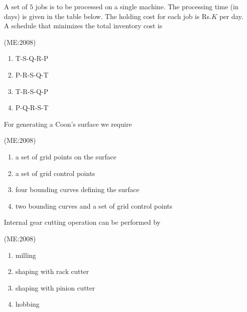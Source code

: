 \item
	A set of $5$ jobs is to be processed on a single machine. The processing time (in days) is given in the table below. The holding cost for each job is Rs.$K$ per day.\\
		
		A schedule that minimizes the total inventory cost is 

		\hfill{(ME:2008)}
		\begin{multicols}{2}
			\begin{enumerate}
				\item T-S-Q-R-P
				\item P-R-S-Q-T
				\item T-R-S-Q-P
				\item P-Q-R-S-T
			\end{enumerate}
		\end{multicols}

    \item
        For generating a Coon's surface we require

		\hfill{(ME:2008)}
        \begin{enumerate}
            
            \item a set of grid points on the surface
            \item a set of grid control points
            \item four bounding curves defining the surface
            \item two bounding curves and a set of grid control points
        \end{enumerate}
    \item
        Internal gear cutting operation can be performed by

        \hfill{(ME:2008)}
        \begin{enumerate}
            \item milling
            \item shaping with rack cutter
            \item shaping with pinion cutter
            \item hobbing
        \end{enumerate}

